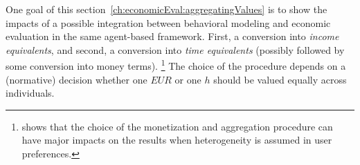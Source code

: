 One goal of this section~\ref{ch:economicEval:aggregatingValues} is to show the impacts of a possible integration between behavioral modeling and economic evaluation in the same agent-based framework. 
%
%
%
%
First, a conversion into \emph{income equivalents}, and second, a conversion into \emph{time equivalents} (possibly followed by some conversion into money terms).%
%
\footnote{
%
\citet{Kickhoefer2014PhD} shows that the choice of the monetization and aggregation procedure can have major impacts on the results when heterogeneity is assumed in user preferences.
%
}
%
The choice of the procedure depends on a (normative) decision whether one $\mathit{EUR}$ or one $h$ should be valued equally across individuals.
